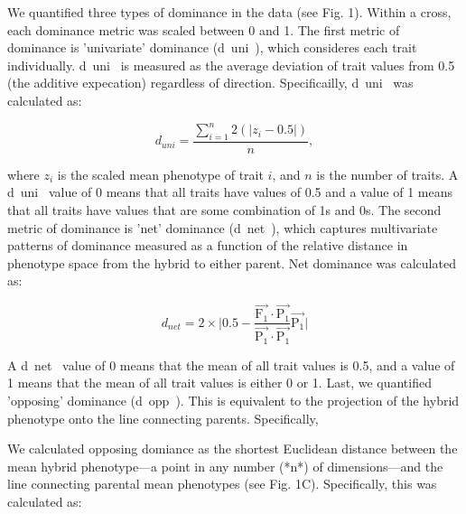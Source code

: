 \documentclass[times, twoside, watermark]{zHenriquesLab-StyleBioRxiv}
\begin{document}

We quantified three types of dominance in the data (see Fig. 1). Within a cross, each dominance metric was scaled between 0 and 1. The first metric of dominance is 'univariate' dominance (d~uni~), which consideres each trait individually. d~uni~ is measured as the average deviation of trait values from 0.5 (the additive expecation) regardless of direction. Specificailly, d~uni~ was calculated as: 

\[ d_{uni} = \frac{ \sum_{i=1}^{n}2(|z_{i} - 0.5|)}n, \]

where $z_{i}$ is the scaled mean phenotype of trait $i$, and $n$ is the number of traits. A d~uni~ value of 0 means that all traits have values of 0.5 and a value of 1 means that all traits have values that are some combination of 1s and 0s. The second metric of dominance is 'net' dominance (d~net~), which captures multivariate patterns of dominance measured as a function of the relative distance in phenotype space from the hybrid to either parent. Net dominance was calculated as:

\[ d_{net} = 2 \times \Bigg| 0.5 - {\frac {{\vec {\textrm{F}_{1}}}\cdot {\vec {\textrm{P}_{1}}}}{{\vec {\textrm{P}_{1}}}\cdot {\vec {\textrm{P}_{1}}}}}{\vec {\textrm{P}_{1}}}\Bigg| \]

A d~net~ value of 0 means that the mean of all trait values is 0.5, and a value of 1 means that the mean of all trait values is either 0 or 1. Last, we quantified 'opposing' dominance (d~opp~). This is equivalent to the projection of the hybrid phenotype onto the line connecting parents. Specifically, 
 
 We calculated opposing domiance as the shortest Euclidean distance between the mean hybrid phenotype---a point in any number (*n*) of dimensions---and the line connecting parental mean phenotypes (see Fig. 1C). Specifically, this was calculated as:
\end{document}
